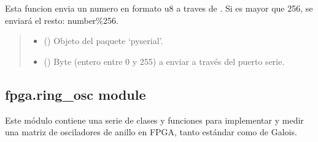 \documentclass[letterpaper,10pt,english]{sphinxmanual}
\begin{document}
\begin{fulllineitems}
\label{\detokenize{fpga.interfaz_pcps:fpga.interfaz_pcps.send_u8}}
\pysigstartsignatures
{}
\pysigstopsignatures
\sphinxAtStartPar
Esta funcion envia un numero en formato u8 a traves de . Si  es mayor que 256, se enviará el resto: number\%256.
\begin{quote}\begin{description}
\begin{itemize}
\item {} 
\sphinxAtStartPar
{} () \textendash{} Objeto  del paquete ‘pyserial’.

\item {} 
\sphinxAtStartPar
{} () \textendash{} Byte (entero entre 0 y 255) a enviar a través del puerto serie.

\end{itemize}


\end{description}\end{quote}

\end{fulllineitems}


\sphinxstepscope


\subsection{fpga.ring\_osc module}
\label{\detokenize{fpga.ring_osc:module-fpga.ring_osc}}\label{\detokenize{fpga.ring_osc:fpga-ring-osc-module}}\label{\detokenize{fpga.ring_osc::doc}}
\sphinxAtStartPar
Este módulo contiene una serie de clases y funciones para implementar y
medir una matriz de osciladores de anillo en FPGA, tanto estándar como
de Galois.
\end{document}
